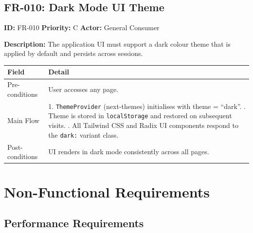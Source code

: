 \documentclass[12pt,a4paper]{report}
\begin{document}
\section{FR-010: Dark Mode UI Theme}

\begin{reqbox}
\textbf{ID:} FR-010 \quad \textbf{Priority:} C \quad \textbf{Actor:} General Consumer
\end{reqbox}

\textbf{Description:} The application UI must support a dark colour theme that
is applied by default and persists across sessions.

\begin{longtable}{L{3cm} L{10cm}}
  \toprule
  \textbf{Field} & \textbf{Detail} \\
  \midrule
  \endhead
  Pre-conditions & User accesses any page. \\[3pt]
  Main Flow &
    1. \texttt{ThemeProvider} (next-themes) initialises with theme = ``dark''. . Theme is stored in \texttt{localStorage} and restored on subsequent visits. . All Tailwind CSS and Radix UI components respond to the \texttt{dark:}
       variant class. \\[3pt]
  Post-conditions & UI renders in dark mode consistently across all pages. \\
  \bottomrule
\end{longtable}

\chapter{Non-Functional Requirements}

\section{Performance Requirements}
\end{document}
